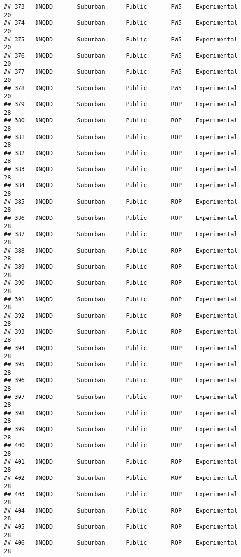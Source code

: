 \documentclass[
]{article}
\begin{document}
\begin{verbatim}
## 373   DNQDD       Suburban      Public       PW5    Experimental        20
## 374   DNQDD       Suburban      Public       PW5    Experimental        20
## 375   DNQDD       Suburban      Public       PW5    Experimental        20
## 376   DNQDD       Suburban      Public       PW5    Experimental        20
## 377   DNQDD       Suburban      Public       PW5    Experimental        20
## 378   DNQDD       Suburban      Public       PW5    Experimental        20
## 379   DNQDD       Suburban      Public       ROP    Experimental        28
## 380   DNQDD       Suburban      Public       ROP    Experimental        28
## 381   DNQDD       Suburban      Public       ROP    Experimental        28
## 382   DNQDD       Suburban      Public       ROP    Experimental        28
## 383   DNQDD       Suburban      Public       ROP    Experimental        28
## 384   DNQDD       Suburban      Public       ROP    Experimental        28
## 385   DNQDD       Suburban      Public       ROP    Experimental        28
## 386   DNQDD       Suburban      Public       ROP    Experimental        28
## 387   DNQDD       Suburban      Public       ROP    Experimental        28
## 388   DNQDD       Suburban      Public       ROP    Experimental        28
## 389   DNQDD       Suburban      Public       ROP    Experimental        28
## 390   DNQDD       Suburban      Public       ROP    Experimental        28
## 391   DNQDD       Suburban      Public       ROP    Experimental        28
## 392   DNQDD       Suburban      Public       ROP    Experimental        28
## 393   DNQDD       Suburban      Public       ROP    Experimental        28
## 394   DNQDD       Suburban      Public       ROP    Experimental        28
## 395   DNQDD       Suburban      Public       ROP    Experimental        28
## 396   DNQDD       Suburban      Public       ROP    Experimental        28
## 397   DNQDD       Suburban      Public       ROP    Experimental        28
## 398   DNQDD       Suburban      Public       ROP    Experimental        28
## 399   DNQDD       Suburban      Public       ROP    Experimental        28
## 400   DNQDD       Suburban      Public       ROP    Experimental        28
## 401   DNQDD       Suburban      Public       ROP    Experimental        28
## 402   DNQDD       Suburban      Public       ROP    Experimental        28
## 403   DNQDD       Suburban      Public       ROP    Experimental        28
## 404   DNQDD       Suburban      Public       ROP    Experimental        28
## 405   DNQDD       Suburban      Public       ROP    Experimental        28
## 406   DNQDD       Suburban      Public       ROP    Experimental        28

\end{verbatim}
\end{document}
